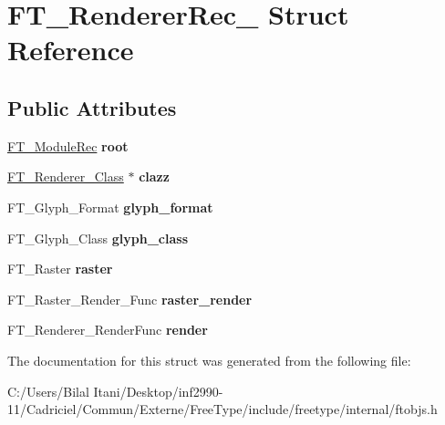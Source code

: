 \hypertarget{struct_f_t___renderer_rec__}{}\section{F\+T\+\_\+\+Renderer\+Rec\+\_\+ Struct Reference}
\label{struct_f_t___renderer_rec__}
\subsection*{Public Attributes}
\begin{DoxyCompactItemize}
\item 
\hyperlink{struct_f_t___module_rec__}{F\+T\+\_\+\+Module\+Rec} {\bfseries root}\hypertarget{struct_f_t___renderer_rec___a7c93326898f03a9eb224f57104fa2433}{}\label{struct_f_t___renderer_rec___a7c93326898f03a9eb224f57104fa2433}

\item 
\hyperlink{struct_f_t___renderer___class__}{F\+T\+\_\+\+Renderer\+\_\+\+Class} $\ast$ {\bfseries clazz}\hypertarget{struct_f_t___renderer_rec___a2b13c0a776ea7f589f41f576f9c4e8ad}{}\label{struct_f_t___renderer_rec___a2b13c0a776ea7f589f41f576f9c4e8ad}

\item 
F\+T\+\_\+\+Glyph\+\_\+\+Format {\bfseries glyph\+\_\+format}\hypertarget{struct_f_t___renderer_rec___a478b14f577b633cea7043fb17d404721}{}\label{struct_f_t___renderer_rec___a478b14f577b633cea7043fb17d404721}

\item 
F\+T\+\_\+\+Glyph\+\_\+\+Class {\bfseries glyph\+\_\+class}\hypertarget{struct_f_t___renderer_rec___a38a591be1d20fb2b4d81e48ebb624dd7}{}\label{struct_f_t___renderer_rec___a38a591be1d20fb2b4d81e48ebb624dd7}

\item 
F\+T\+\_\+\+Raster {\bfseries raster}\hypertarget{struct_f_t___renderer_rec___a9c54a2da84f5892e0563d032ebd1ee09}{}\label{struct_f_t___renderer_rec___a9c54a2da84f5892e0563d032ebd1ee09}

\item 
F\+T\+\_\+\+Raster\+\_\+\+Render\+\_\+\+Func {\bfseries raster\+\_\+render}\hypertarget{struct_f_t___renderer_rec___a6dc07268fc39d9dde130a5708607d19d}{}\label{struct_f_t___renderer_rec___a6dc07268fc39d9dde130a5708607d19d}

\item 
F\+T\+\_\+\+Renderer\+\_\+\+Render\+Func {\bfseries render}\hypertarget{struct_f_t___renderer_rec___a197bfeb9dde4aef8eee87bc3ea95312e}{}\label{struct_f_t___renderer_rec___a197bfeb9dde4aef8eee87bc3ea95312e}

\end{DoxyCompactItemize}


The documentation for this struct was generated from the following file\+:\begin{DoxyCompactItemize}
\item 
C\+:/\+Users/\+Bilal Itani/\+Desktop/inf2990-\/11/\+Cadriciel/\+Commun/\+Externe/\+Free\+Type/include/freetype/internal/ftobjs.\+h\end{DoxyCompactItemize}
